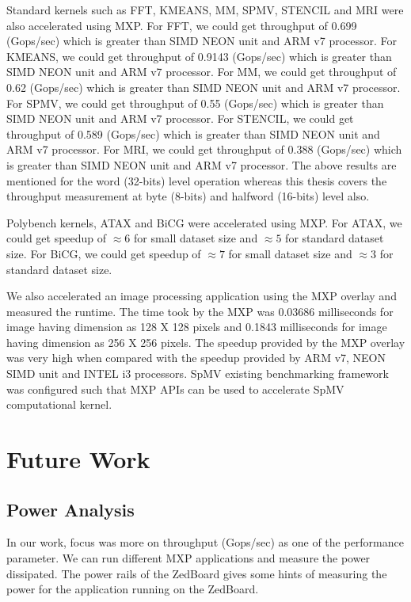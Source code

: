 Standard kernels such as FFT, KMEANS, MM, SPMV, STENCIL and MRI were also accelerated using MXP. For FFT, we could get throughput of 0.699 (Gops/sec) which is greater than SIMD NEON unit and ARM v7 processor. For KMEANS, we could get throughput of 0.9143 (Gops/sec) which is greater than SIMD NEON unit and ARM v7 processor. For MM, we could get throughput of 0.62 (Gops/sec) which is greater than SIMD NEON unit and ARM v7 processor. For SPMV, we could get throughput of 0.55 (Gops/sec) which is greater than SIMD NEON unit and ARM v7 processor. For STENCIL, we could get throughput of 0.589 (Gops/sec) which is greater than SIMD NEON unit and ARM v7 processor. For MRI, we could get throughput of 0.388 (Gops/sec) which is greater than SIMD NEON unit and ARM v7 processor. The above results are mentioned for the word (32-bits) level operation whereas this thesis covers the throughput measurement at byte (8-bits) and halfword (16-bits) level also.



Polybench kernels, ATAX and BiCG were accelerated using MXP. For ATAX, we could get speedup of ${\approx}6$ for small dataset size and ${\approx}5$ for standard dataset size. For BiCG, we could get speedup of ${\approx}7$ for small dataset size and ${\approx}3$ for standard dataset size.



We also accelerated an image processing application using the MXP overlay and measured the runtime. The time took by the MXP was 0.03686 milliseconds for image having dimension as 128 X 128 pixels and 0.1843 milliseconds for image having dimension as 256 X 256 pixels. The speedup provided by the MXP overlay was very high when compared with the speedup provided by ARM v7, NEON SIMD unit and INTEL i3 processors. SpMV existing benchmarking framework was configured such that MXP APIs can be used to accelerate SpMV computational kernel.



\section{Future Work}

\subsection{Power Analysis}
In our work, focus was more on throughput (Gops/sec) as one of the performance parameter. We can run different MXP applications and measure the power dissipated. The power rails of the ZedBoard gives some hints of measuring the power for the application running on the ZedBoard. 

